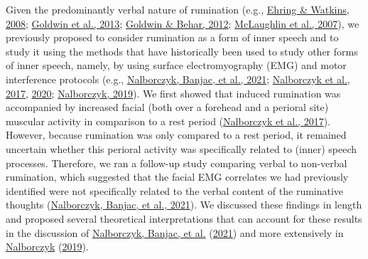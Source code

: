 \documentclass[
  english,
  man, donotrepeattitle,floatsintext]{apa6}
\begin{document}
Given the predominantly verbal nature of rumination (e.g., \protect\hyperlink{ref-ehring_repetitive_2008}{Ehring \& Watkins, 2008}; \protect\hyperlink{ref-goldwin_concreteness_2013}{Goldwin et al., 2013}; \protect\hyperlink{ref-goldwin_concreteness_2012}{Goldwin \& Behar, 2012}; \protect\hyperlink{ref-mclaughlin_effects_2007}{McLaughlin et al., 2007}), we previously proposed to consider rumination as a form of inner speech and to study it using the methods that have historically been used to study other forms of inner speech, namely, by using surface electromyography (EMG) and motor interference protocols (e.g., \protect\hyperlink{ref-nalborczyk_dissociating_2021}{Nalborczyk, Banjac, et al., 2021}; \protect\hyperlink{ref-nalborczyk_orofacial_2017}{Nalborczyk et al., 2017}, \protect\hyperlink{ref-nalborczyk_articulatory_2020}{2020}; \protect\hyperlink{ref-nalborczyk_understanding_2019}{Nalborczyk, 2019}). We first showed that induced rumination was accompanied by increased facial (both over a forehead and a perioral site) muscular activity in comparison to a rest period (\protect\hyperlink{ref-nalborczyk_orofacial_2017}{Nalborczyk et al., 2017}). However, because rumination was only compared to a rest period, it remained uncertain whether this perioral activity was specifically related to (inner) speech processes. Therefore, we ran a follow-up study comparing verbal to non-verbal rumination, which suggested that the facial EMG correlates we had previously identified were not specifically related to the verbal content of the ruminative thoughts (\protect\hyperlink{ref-nalborczyk_dissociating_2021}{Nalborczyk, Banjac, et al., 2021}). We discussed these findings in length and proposed several theoretical interpretations that can account for these results in the discussion of \protect\hyperlink{ref-nalborczyk_dissociating_2021}{Nalborczyk, Banjac, et al.} (\protect\hyperlink{ref-nalborczyk_dissociating_2021}{2021}) and more extensively in \protect\hyperlink{ref-nalborczyk_understanding_2019}{Nalborczyk} (\protect\hyperlink{ref-nalborczyk_understanding_2019}{2019}).
\end{document}
